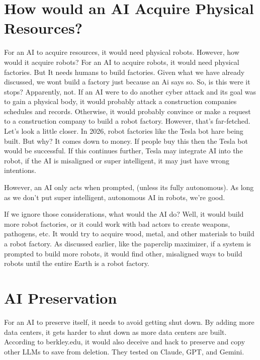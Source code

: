 \documentclass{report}
\begin{document}
	\section{How would an AI Acquire Physical Resources?}
	
	For an AI to acquire resources, it would need physical robots. However, how would it acquire robots? For an AI to acquire robots, it would need physical factories. But It needs humans to build factories. Given what we have already discussed, we wont build a factory just because an Ai says so. So, is this were it stops? Apparently, not. If an AI were to do another cyber attack and its goal was to gain a physical body, it would probably attack a construction companies schedules and records. Otherwise, it would probably convince or make a request to a construction company to build a robot factory. However, that's far-fetched. Let's look a little closer. In 2026, robot factories like the Tesla bot hare being built. But why? It comes down to money. If people buy this then the Tesla bot would be successful. If this continues further, Tesla may integrate AI into the robot, if the AI is misaligned or super intelligent, it may just have wrong intentions.
	
	\vspace{1cm}
	
	However, an AI only acts when prompted, (unless its fully autonomous). As long as we don't put super intelligent, autonomous AI in robots, we're good.
	
	\vspace{1cm}
	
	If we ignore those considerations, what would the AI do? Well, it would build more robot factories, or it could work with bad actors to create weapons, pathogens, etc. It would try to acquire wood, metal, and other materials to build a robot factory. As discussed earlier, like the paperclip maximizer, if a system is prompted to build more robots, it would find other, misaligned ways to build robots until the entire Earth is a robot factory.
	
	\section{AI Preservation}
	For an AI to preserve itself, it needs to avoid getting shut down. By adding more data centers, it gets harder to shut down as more data centers are built. According to berkley.edu, it would also deceive and hack to preserve and copy other LLMs to save from deletion. They tested on Claude, GPT, and Gemini. 
	
\end{document}
